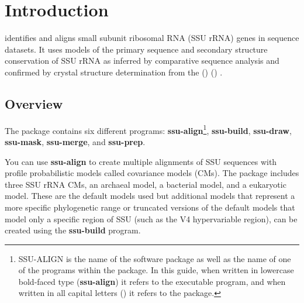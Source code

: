 \section{Introduction}

 identifies and aligns small subunit ribosomal RNA
(SSU rRNA) genes in sequence datasets. It uses models of the primary
sequence and secondary structure conservation of SSU rRNA as inferred
by comparative sequence analysis and confirmed by crystal structure
determination from the  () 
()
\cite{CannoneGutell02}.

\subsection{Overview}
The  package contains six different
programs: \textbf{ssu-align}\footnote{SSU-ALIGN is the name of the
  software package as well as the name of one of the programs within
  the package. In this guide, when written in lowercase bold-faced
  type (\textbf{ssu-align}) it refers to the executable program, and
  when written in all capital letters () it refers to
  the package.},
\textbf{ssu-build}, \textbf{ssu-draw}, 
\textbf{ssu-mask}, \textbf{ssu-merge}, and \textbf{ssu-prep}. 

You can use \textbf{ssu-align} to create multiple alignments of SSU
sequences with profile probabilistic models called covariance models
(CMs). The package includes three SSU rRNA CMs, an archaeal model, a
bacterial model, and a eukaryotic model. These are the default models
used but additional models that represent a more specific phylogenetic
range or truncated versions of the default models that model only a
specific region of SSU (such as the V4 hypervariable region), can be
created using the \textbf{ssu-build} program.

